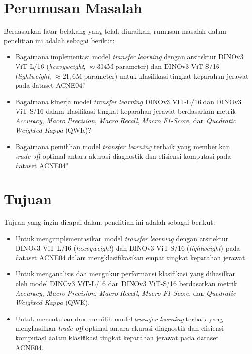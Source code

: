 \section{Perumusan Masalah}

Berdasarkan latar belakang yang telah diuraikan, rumusan masalah dalam penelitian ini adalah sebagai berikut:

\begin{itemize}
    \item Bagaimana implementasi model \textit{transfer learning} dengan arsitektur DINOv3 ViT-L/16 (\textit{heavyweight}, $\approx 304\text{M}$ parameter) dan DINOv3 ViT-S/16 (\textit{lightweight}, $\approx 21,6\text{M}$ parameter) untuk klasifikasi tingkat keparahan jerawat pada dataset ACNE04?
    
    \item Bagaimana kinerja model \textit{transfer learning} DINOv3 ViT-L/16 dan DINOv3 ViT-S/16 dalam klasifikasi tingkat keparahan jerawat berdasarkan metrik \textit{Accuracy}, \textit{Macro Precision}, \textit{Macro Recall}, \textit{Macro F1-Score}, dan \textit{Quadratic Weighted Kappa} (QWK)?
    
    \item Bagaimana pemilihan model \textit{transfer learning} terbaik yang memberikan \textit{trade-off} optimal antara akurasi diagnostik dan efisiensi komputasi pada dataset ACNE04?
\end{itemize}

\section{Tujuan}

Tujuan yang ingin dicapai dalam penelitian ini adalah sebagai berikut:

\begin{itemize}
    \item Untuk mengimplementasikan model \textit{transfer learning} dengan arsitektur DINOv3 ViT-L/16 (\textit{heavyweight}) dan DINOv3 ViT-S/16 (\textit{lightweight}) pada dataset ACNE04 dalam mengklasifikasikan empat tingkat keparahan jerawat.
    
    \item Untuk menganalisis dan mengukur performansi klasifikasi yang dihasilkan oleh model DINOv3 ViT-L/16 dan DINOv3 ViT-S/16 berdasarkan metrik \textit{Accuracy}, \textit{Macro Precision}, \textit{Macro Recall}, \textit{Macro F1-Score}, dan \textit{Quadratic Weighted Kappa} (QWK).
    
    \item Untuk menentukan dan memilih model \textit{transfer learning} terbaik yang menghasilkan \textit{trade-off} optimal antara akurasi diagnostik dan efisiensi komputasi dalam klasifikasi tingkat keparahan jerawat pada dataset ACNE04.
\end{itemize}

